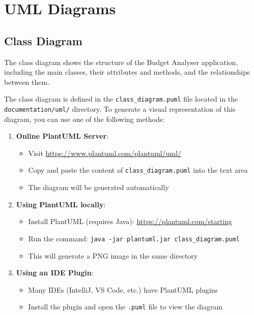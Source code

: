 \documentclass[11pt,a4paper]{report}
\begin{document}
\chapter{UML Diagrams}

\section{Class Diagram}
The class diagram shows the structure of the Budget Analyser application, including the main classes, their attributes and methods, and the relationships between them.

The class diagram is defined in the \texttt{class\_diagram.puml} file located in the \texttt{documentation/uml/} directory. To generate a visual representation of this diagram, you can use one of the following methods:

\begin{enumerate}
    \item \textbf{Online PlantUML Server}:
    \begin{itemize}
        \item Visit \url{https://www.plantuml.com/plantuml/uml/}
        \item Copy and paste the content of \texttt{class\_diagram.puml} into the text area
        \item The diagram will be generated automatically
    \end{itemize}
    
    \item \textbf{Using PlantUML locally}:
    \begin{itemize}
        \item Install PlantUML (requires Java): \url{https://plantuml.com/starting}
        \item Run the command: \texttt{java -jar plantuml.jar class\_diagram.puml}
        \item This will generate a PNG image in the same directory
    \end{itemize}
    
    \item \textbf{Using an IDE Plugin}:
    \begin{itemize}
        \item Many IDEs (IntelliJ, VS Code, etc.) have PlantUML plugins
        \item Install the plugin and open the \texttt{.puml} file to view the diagram
    \end{itemize}
\end{enumerate}
\end{document}
